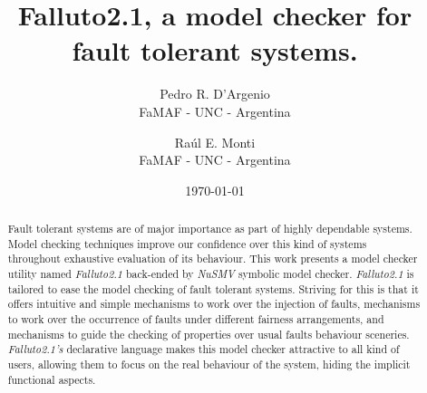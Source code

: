 \documentclass[12pt]{article}
\title{Falluto2.1, a model checker for fault tolerant systems.}
\author{ Pedro R. D'Argenio\\ FaMAF - UNC - Argentina \and Ra\'ul E. Monti\\
	 FaMAF - UNC - Argentina
}
\date{\today}
\begin{document}
\maketitle



\begin{abstract}
Fault tolerant systems are of major importance as part of highly dependable 
systems. Model checking techniques improve our confidence over this kind of
systems throughout exhaustive evaluation of its behaviour. This work presents
a model checker utility named \mbox{\textit{Falluto2.1}} back-ended by 
\mbox{\textit{NuSMV}} symbolic model checker. \mbox{\textit{Falluto2.1}} is
tailored to ease the model checking of fault tolerant systems. Striving for
this is that it offers intuitive and simple mechanisms to work over the 
injection of faults, mechanisms to work over the occurrence of faults under
different fairness arrangements, and mechanisms to guide the checking of 
properties over usual faults behaviour sceneries. \mbox{\textit{Falluto2.1's}}
declarative language makes this model checker attractive to all kind of users,
allowing them to focus on the real behaviour of the system, hiding the implicit
functional aspects.
\end{abstract}
\end{document}
